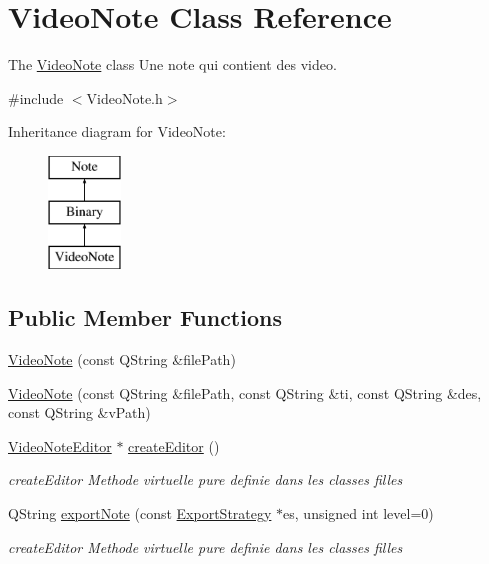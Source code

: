\hypertarget{class_video_note}{\section{Video\-Note Class Reference}
\label{class_video_note}
}


The \hyperlink{class_video_note}{Video\-Note} class Une note qui contient des video.  




{\ttfamily \#include $<$Video\-Note.\-h$>$}

Inheritance diagram for Video\-Note\-:\begin{figure}[H]
\begin{center}
\leavevmode
\includegraphics[height=3.000000cm]{class_video_note}
\end{center}
\end{figure}
\subsection*{Public Member Functions}
\begin{DoxyCompactItemize}
\item 
\hyperlink{class_video_note_a4d5b50b0d1909d216261ded20a769395}{Video\-Note} (const Q\-String \&file\-Path)
\item 
\hyperlink{class_video_note_a70308491c831c556527e86075f55792f}{Video\-Note} (const Q\-String \&file\-Path, const Q\-String \&ti, const Q\-String \&des, const Q\-String \&v\-Path)
\item 
\hyperlink{class_video_note_editor}{Video\-Note\-Editor} $\ast$ \hyperlink{class_video_note_ac88a41945a78c6b89e3f40540da53a54}{create\-Editor} ()
\begin{DoxyCompactList}\small\item\em create\-Editor Methode virtuelle pure definie dans les classes filles \end{DoxyCompactList}\item 
Q\-String \hyperlink{class_video_note_adacf574a5c60de47b2056df1ae160880}{export\-Note} (const \hyperlink{class_export_strategy}{Export\-Strategy} $\ast$es, unsigned int level=0)
\begin{DoxyCompactList}\small\item\em create\-Editor Methode virtuelle pure definie dans les classes filles \end{DoxyCompactList}\end{DoxyCompactItemize}
